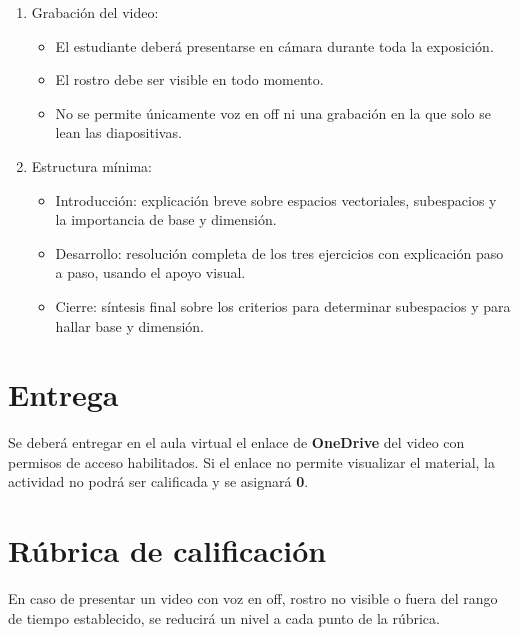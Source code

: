 \documentclass[a4,11pt]{aleph-notas}
\begin{document}
\begin{enumerate}
    \item {Grabación del video:}
    \begin{itemize}
        \item El estudiante deberá presentarse en cámara durante toda la exposición.
        \item El rostro debe ser visible en todo momento.
        \item No se permite únicamente voz en off ni una grabación en la que solo se lean las diapositivas.
    \end{itemize}

    \item {Estructura mínima:}
    \begin{itemize}
        \item {Introducción:} explicación breve sobre espacios vectoriales, subespacios y la importancia de base y dimensión.
        \item {Desarrollo:} resolución completa de los tres ejercicios con explicación paso a paso, usando el apoyo visual.
        \item {Cierre:} síntesis final sobre los criterios para determinar subespacios y para hallar base y dimensión.
    \end{itemize}
\end{enumerate}

\section{Entrega}

Se deberá entregar en el aula virtual el enlace de \textbf{OneDrive} del video con permisos de acceso habilitados. Si el enlace no permite visualizar el material, la actividad no podrá ser calificada y se asignará \textbf{0}.

\section{Rúbrica de calificación}

En caso de presentar un video con voz en off, rostro no visible o fuera del rango de tiempo establecido, se reducirá un nivel a cada punto de la rúbrica.
\end{document}
